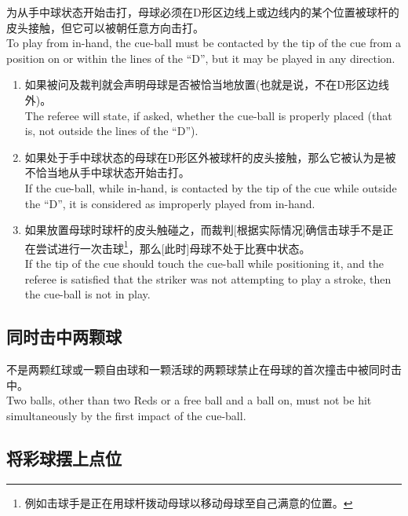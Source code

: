 \noindent 为从手中球状态开始击打，母球必须在D形区边线上或边线内的某个位置被球杆的皮头接触，但它可以被朝任意方向击打。\\
To play from in-hand, the cue-ball must be contacted by the tip of the cue from a position on or within the lines of the ``D'', but it may be played in any direction.
\begin{enumerate}[label=(\alph*)]
    \item 如果被问及裁判就会声明母球是否被恰当地放置(也就是说，不在D形区边线外)。\\
    The referee will state, if asked, whether the cue-ball is properly placed (that is, not outside the lines of the ``D'').
    \item 如果处于手中球状态的母球在D形区外被球杆的皮头接触，那么它被认为是被不恰当地从手中球状态开始击打。\\
    If the cue-ball, while in-hand, is contacted by the tip of the cue while outside the ``D'', it is considered as improperly played from in-hand.
    \item 如果放置母球时球杆的皮头触碰之，而裁判[根据实际情况]确信击球手不是正在尝试进行一次击球\footnote{例如击球手是正在用球杆拨动母球以移动母球至自己满意的位置。}，那么[此时]母球不处于比赛中状态。\\
    If the tip of the cue should touch the cue-ball while positioning it, and the referee is satisfied that the striker was not attempting to play a stroke, then the cue-ball is not in play.
\end{enumerate}

\subsection{同时击中两颗球}

\noindent 不是两颗红球或一颗自由球和一颗活球的两颗球禁止在母球的首次撞击中被同时击中。\\
Two balls, other than two Reds or a free ball and a ball on, must not be hit simultaneously by the first impact of the cue-ball.

\subsection{将彩球摆上点位}\label{2237}

